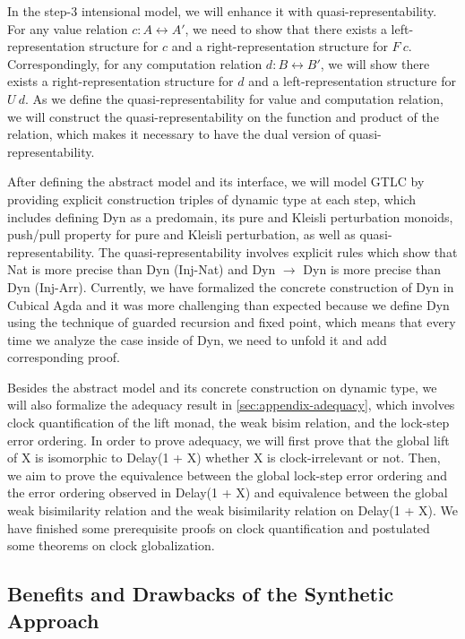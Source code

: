 In the step-3 intensional model, we will enhance it with 
quasi-representability. For any value relation $c : A \rel A'$, we need 
to show that there exists a left-representation structure for $c$ and a 
right-representation structure for $F\ c$. Correspondingly, for any 
computation relation $d : B \rel B'$, we will show there exists a 
right-representation structure for $d$ and a left-representation 
structure for $U\ d$. As we define the quasi-representability for value 
and computation relation, we will construct the quasi-representability on 
the function and product of the relation, which makes it necessary to 
have the dual version of quasi-representability.

After defining the abstract model and its interface, we will model GTLC 
by providing explicit construction triples of dynamic type at each step, 
which includes defining Dyn as a predomain, its pure and Kleisli 
perturbation monoids, push/pull property for pure and Kleisli 
perturbation, as well as quasi-representability. The 
quasi-representability involves explicit rules which show that Nat is 
more precise than Dyn (Inj-Nat) and Dyn $\to$ Dyn is more precise than 
Dyn (Inj-Arr). Currently, we have formalized the concrete construction of 
Dyn in Cubical Agda and it was more challenging than expected because we 
define Dyn using the technique of guarded recursion and fixed point, which 
means that every time we analyze the case inside of Dyn, we need to unfold 
it and add corresponding proof. 

Besides the abstract model and its concrete construction on dynamic type, 
we will also formalize the adequacy result in \ref{sec:appendix-adequacy}, 
which involves clock quantification of the lift monad, the weak bisim 
relation, and the lock-step error ordering. In order to prove adequacy, 
we will first prove that the global lift of X is isomorphic to Delay(1 + X)
whether X is clock-irrelevant or not. Then, we aim to prove the equivalence 
between the global lock-step error ordering and the error ordering observed 
in Delay(1 + X) and equivalence between the global weak bisimilarity 
relation and the weak bisimilarity relation on Delay(1 + X). We have 
finished some prerequisite proofs on clock quantification and postulated 
some theorems on clock globalization.

\subsection{Benefits and Drawbacks of the Synthetic Approach}

